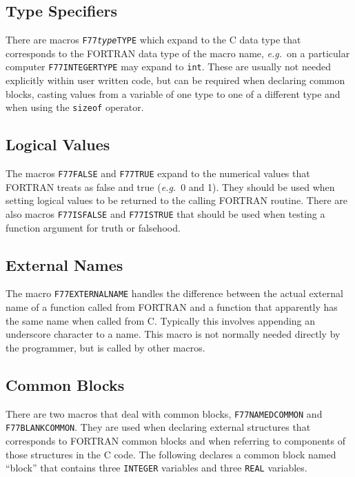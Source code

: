 \documentclass[twoside,11pt]{article}
\newcommand{\htmlref}[2]{#1}
\newcommand{\xlabel}[1]{}
\renewcommand{\_}{\texttt{\symbol{95}}}
\begin{document}
\subsection{\xlabel{type_specifiers}Type Specifiers}

There are macros \texttt{F77\_\textit{type}\_TYPE}
which expand to the C data type that corresponds to the FORTRAN data type of
the macro name, \textit{e.g.}\ on a particular computer 
\htmlref{\texttt{F77\_\-INTEGER\_\-TYPE}}{F77_INTEGER_TYPE} may expand to 
\texttt{int}. 
These are usually not needed explicitly within user written code, but can be 
required when declaring common blocks, casting values from a variable of one 
type to one of a different type and when using the \texttt{sizeof} operator.

\subsection{\xlabel{logical_values}Logical Values}

The macros 
\htmlref{\texttt{F77\_\-FALSE}}{F77_FALSE}
and 
\htmlref{\texttt{F77\_\-TRUE}}{F77_TRUE}
expand to the 
numerical values that FORTRAN treats as false and true ({\em{e.g.}}\ 0 and 1). 
They should be used when setting logical values to be returned to the calling 
FORTRAN routine.
There are also macros 
\htmlref{\texttt{F77\_\-ISFALSE}}{F77_ISFALSE} 
and 
\htmlref{\texttt{F77\_\-ISTRUE}}{F77_ISTRUE}
that should be used when testing a function argument for truth or falsehood.

\subsection{\xlabel{external_names}External Names}

The macro 
\htmlref{\texttt{F77\_\-EXTERNAL\_\-NAME}}{F77_EXTERNAL_NAME}
handles the difference between the
actual external name of a function called from FORTRAN and a function that
apparently has the same name when called from C\@. Typically this involves
appending an underscore character to a name. This macro is not normally needed
directly by the programmer, but is called by other macros.

\subsection{\xlabel{common_blocks}\label{f77_common}Common Blocks}

There are two macros that deal with common blocks, 
\htmlref{\texttt{F77\_\-NAMED\_\-COMMON}}{F77_NAMED_COMMON}
and 
\htmlref{\texttt{F77\_\-BLANK\_\-COMMON}}{F77_BLANK_COMMON}\@. 
They are used when declaring external
structures that corresponds to FORTRAN common blocks and when referring to
components of those structures in the C code. The following declares a common
block named ``block'' that contains three \texttt{INTEGER} variables and three 
\texttt{REAL} variables.
\end{document}

